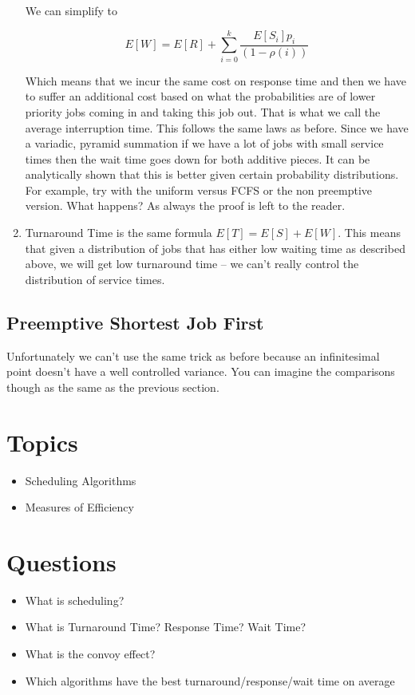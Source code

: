\begin{enumerate}
  We can simplify to

  \[
  E[W] = E[R] + \sum\limits_{i=0}^k \frac{E[S_i]p_i}{(1 - \rho(i))}
  \]

  Which means that we incur the same cost on response time and then we have to suffer an additional cost based on what the probabilities are of lower priority jobs coming in and taking this job out.
  That is what we call the average interruption time.
  This follows the same laws as before.
  Since we have a variadic, pyramid summation if we have a lot of jobs with small service times then the wait time goes down for both additive pieces.
  It can be analytically shown that this is better given certain probability distributions.
  For example, try with the uniform versus FCFS or the non preemptive version.
  What happens?
  As always the proof is left to the reader.

\item Turnaround Time is the same formula $E[T] = E[S] + E[W]$. This means that given a distribution of jobs that has either low waiting time as described above, we will get low turnaround time -- we can't really control the distribution of service times.
\end{enumerate}

\subsection{Preemptive Shortest Job First}

Unfortunately we can't use the same trick as before because an infinitesimal point doesn't have a well controlled variance.
You can imagine the comparisons though as the same as the previous section.

\section{Topics}

\begin{itemize}
\tightlist
\item
  Scheduling Algorithms
\item
  Measures of Efficiency
\end{itemize}

\section{Questions}

\begin{itemize}
\tightlist
\item
  What is scheduling?
\item
  What is Turnaround Time? Response Time? Wait Time?
\item
  What is the convoy effect?
\item
  Which algorithms have the best turnaround/response/wait time on average
\end{itemize}



